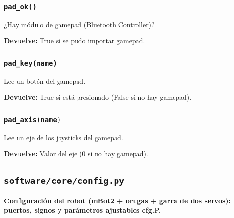 \subsubsection{\texttt{pad\_\allowbreak{}ok()}}\label{fn:hal:pad-ok}
\noindent ¿Hay módulo de gamepad (Bluetooth Controller)?

\noindent\textbf{Devuelve:} True si se pudo importar gamepad.\par

\subsubsection{\texttt{pad\_\allowbreak{}key(name)}}\label{fn:hal:pad-key}
\noindent Lee un botón del gamepad.

\par{}\par\smallskip
\noindent\textbf{Devuelve:} True si está presionado (False si no hay gamepad).\par

\subsubsection{\texttt{pad\_\allowbreak{}axis(name)}}\label{fn:hal:pad-axis}
\noindent Lee un eje de los joysticks del gamepad.

\par{}\par\smallskip
\noindent\textbf{Devuelve:} Valor del eje (0 si no hay gamepad).\par

\subsection{\texttt{software/core/config.py}}\label{mod:config}
\textbf{Configuración del robot (mBot2 + orugas + garra de dos servos): puertos, signos y parámetros ajustables cfg.P.}

